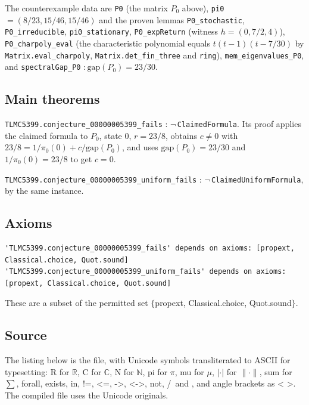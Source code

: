 \documentclass[11pt,a4paper]{article}
\begin{document}
\noindent The counterexample data are \texttt{P0} (the matrix $P_0$ above), \texttt{pi0} $=(8/23,15/46,15/46)$ and the proven lemmas \texttt{P0\_stochastic}, \texttt{P0\_irreducible}, \texttt{pi0\_stationary}, \texttt{P0\_expReturn} (witness $h=(0,7/2,4)$), \texttt{P0\_charpoly\_eval} (the characteristic polynomial equals $t(t-1)(t-7/30)$ by \texttt{Matrix.eval\_charpoly}, \texttt{Matrix.det\_fin\_three} and \texttt{ring}), \texttt{mem\_eigenvalues\_P0}, and \texttt{spectralGap\_P0} $: \mathrm{gap}(P_0)=23/30$.

\subsection*{Main theorems}

\texttt{TLMC5399.conjecture\_00000005399\_fails} : $\neg$\,\texttt{ClaimedFormula}. Its proof applies the claimed formula to $P_0$, state $0$, $r=23/8$, obtains $c\neq 0$ with $23/8=1/\pi_0(0)+c/\mathrm{gap}(P_0)$, and uses $\mathrm{gap}(P_0)=23/30$ and $1/\pi_0(0)=23/8$ to get $c=0$.

\texttt{TLMC5399.conjecture\_00000005399\_uniform\_fails} : $\neg$\,\texttt{ClaimedUniformFormula}, by the same instance.

\subsection*{Axioms}

\begin{lstlisting}[language={},numbers=none,frame=single]
'TLMC5399.conjecture_00000005399_fails' depends on axioms: [propext, Classical.choice, Quot.sound]
'TLMC5399.conjecture_00000005399_uniform_fails' depends on axioms: [propext, Classical.choice, Quot.sound]
\end{lstlisting}

These are a subset of the permitted set $\{$propext, Classical.choice, Quot.sound$\}$.

\subsection*{Source}

The listing below is the file, with Unicode symbols transliterated to ASCII for typesetting: R for $\mathbb{R}$, C for $\mathbb{C}$, N for $\mathbb{N}$, pi for $\pi$, mu for $\mu$, $|\cdot|$ for $\|\cdot\|$, sum for $\sum$, forall, exists, in, !=, <=, ->, <->, not, /\ and \/, and angle brackets as < >. The compiled file uses the Unicode originals.
\end{document}
